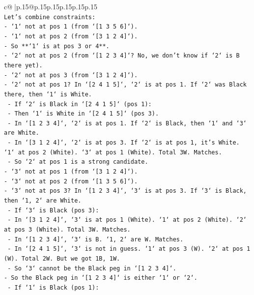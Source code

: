 \documentclass{article}
\begin{document}
{\begin{supertabular}{c@{$\;$}|p{.15\linewidth}@{}p{.15\linewidth}p{.15\linewidth}p{.15\linewidth}p{.15\linewidth}p{.15\linewidth}}
{{{\\ 
\texttt{Let's combine constraints:} \\
\texttt{{-} `1` not at pos 1 (from `{[}1 3 5 6{]}`).} \\
\texttt{{-} `1` not at pos 2 (from `{[}3 1 2 4{]}`).} \\
\texttt{{-} So **`1` is at pos 3 or 4**.} \\
\texttt{{-} `2` not at pos 2 (from `{[}1 2 3 4{]}`? No, we don't know if `2` is B there yet).} \\
\texttt{{-} `2` not at pos 3 (from `{[}3 1 2 4{]}`).} \\
\texttt{{-} `2` not at pos 1? In `{[}2 4 1 5{]}`, `2` is at pos 1. If `2` was Black there, then `1` is White.} \\
\texttt{    {-} If `2` is Black in `{[}2 4 1 5{]}` (pos 1):} \\
\texttt{        {-} Then `1` is White in `{[}2 4 1 5{]}` (pos 3).} \\
\texttt{        {-} In `{[}1 2 3 4{]}`, `2` is at pos 1. If `2` is Black, then `1` and `3` are White.} \\
\texttt{        {-} In `{[}3 1 2 4{]}`, `2` is at pos 3. If `2` is at pos 1, it's White. `1` at pos 2 (White). `3` at pos 1 (White). Total 3W. Matches.} \\
\texttt{        {-} So `2` at pos 1 is a strong candidate.} \\
\texttt{{-} `3` not at pos 1 (from `{[}3 1 2 4{]}`).} \\
\texttt{{-} `3` not at pos 2 (from `{[}1 3 5 6{]}`).} \\
\texttt{{-} `3` not at pos 3? In `{[}1 2 3 4{]}`, `3` is at pos 3. If `3` is Black, then `1, 2` are White.} \\
\texttt{    {-} If `3` is Black (pos 3):} \\
\texttt{        {-} In `{[}3 1 2 4{]}`, `3` is at pos 1 (White). `1` at pos 2 (White). `2` at pos 3 (White). Total 3W. Matches.} \\
\texttt{        {-} In `{[}1 2 3 4{]}`, `3` is B. `1, 2` are W. Matches.} \\
\texttt{        {-} In `{[}2 4 1 5{]}`, `3` is not in guess. `1` at pos 3 (W). `2` at pos 1 (W). Total 2W. But we got 1B, 1W.} \\
\texttt{        {-} So `3` cannot be the Black peg in `{[}1 2 3 4{]}`.} \\
\texttt{{-} So the Black peg in `{[}1 2 3 4{]}` is either `1` or `2`.} \\
\texttt{    {-} If `1` is Black (pos 1):} \\
}}}
\end{supertabular}}
\end{document}
